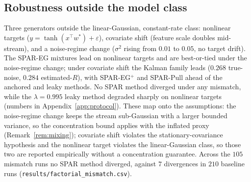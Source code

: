 \documentclass[10pt]{article}
\begin{document}
\subsection{Robustness outside the model class}
Three generators outside the linear-Gaussian, constant-rate class: nonlinear targets ($y = \tanh(x^\top w^*) + \varepsilon$), covariate shift (feature scale doubles mid-stream), and a noise-regime change ($\sigma^2$ rising from $0.01$ to $0.05$, no target drift).
The SPAR-EG mixtures lead on nonlinear targets and are best-or-tied under the noise-regime change; under covariate shift the Kalman family leads ($0.268$ true-noise, $0.284$ estimated-$R$), with SPAR-EG$^+$ and SPAR-Pull ahead of the anchored and leaky methods.
No SPAR method diverged under any mismatch, while the $\lambda = 0.995$ leaky method degraded sharply on nonlinear targets (numbers in Appendix~\ref{app:protocol}). These map onto the assumptions: the noise-regime change keeps the stream sub-Gaussian with a larger bounded variance, so the concentration bound applies with the inflated proxy (Remark~\ref{rem:mixing}); covariate shift violates the stationary-covariance hypothesis and the nonlinear target violates the linear-Gaussian class, so those two are reported empirically without a concentration guarantee. Across the $105$ mismatch runs no SPAR method diverged, against $7$ divergences in $210$ baseline runs (\texttt{results/factorial\_mismatch.csv}).
\end{document}
